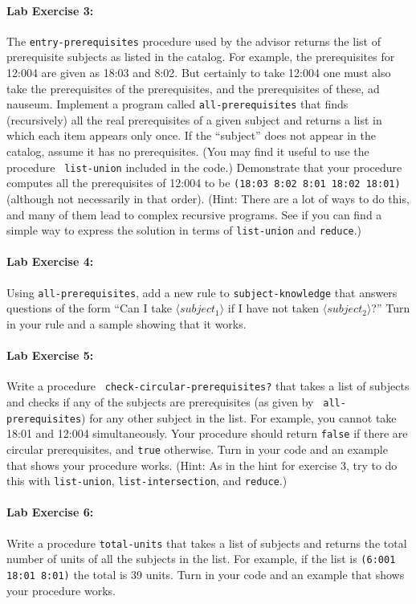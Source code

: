 \paragraph{Lab Exercise 3:}
The {\tt entry-prerequisites} procedure used by the advisor returns
the list of prerequisite subjects as listed in the catalog.  For
example, the prerequisites for 12:004 are given as 18:03 and 8:02.
But certainly to take 12:004 one must also take the prerequisites of
the prerequisites, and the prerequisites of these, ad nauseum.
Implement a program called {\tt all-prerequisites} that finds
(recursively) all the real prerequisites of a given subject and
returns a list in which each item appears only once.  If the
``subject'' does not appear in the catalog, assume it has no
prerequisites.  (You may find it useful to use the procedure {\tt
list-union} included in the code.)  Demonstrate that your procedure
computes all the prerequisites of 12:004 to be {\tt (18:03 8:02 8:01
18:02 18:01)} (although not necessarily in that order).  (Hint: There
are a lot of ways to do this, and many of them lead to complex
recursive programs.  See if you can find a simple way to express the
solution in terms of {\tt list-union} and {\tt reduce}.)


\paragraph{Lab Exercise 4:} Using {\tt all-prerequisites}, add a new
rule to {\tt subject-knowledge} that answers questions of the form
``Can I take $\langle subject_1\rangle$ if I have not taken $\langle
subject_2\rangle$?'' Turn in your rule and a sample showing that it
works.

\paragraph{Lab Exercise 5:} Write a procedure {\tt
check-circular-prerequisites?} that takes a list of subjects and
checks if any of the subjects are prerequisites (as given by {\tt
all-prerequisites}) for any other subject in the list.  For example,
you cannot take 18:01 and 12:004 simultaneously.  Your procedure
should return {\tt false} if there are circular prerequisites, and
{\tt true} otherwise.  Turn in your code and an example that shows
your procedure works.  (Hint: As in the hint for exercise 3, try to do
this with {\tt list-union}, {\tt list-intersection}, and {\tt reduce}.)

\paragraph{Lab Exercise 6:}
Write a procedure {\tt total-units} that takes a list of subjects and
returns the total number of units of all the subjects in the list.
For example, if the list is {\tt (6:001 18:01 8:01)} the total is 39
units.  Turn in your code and an example that shows your procedure works.

